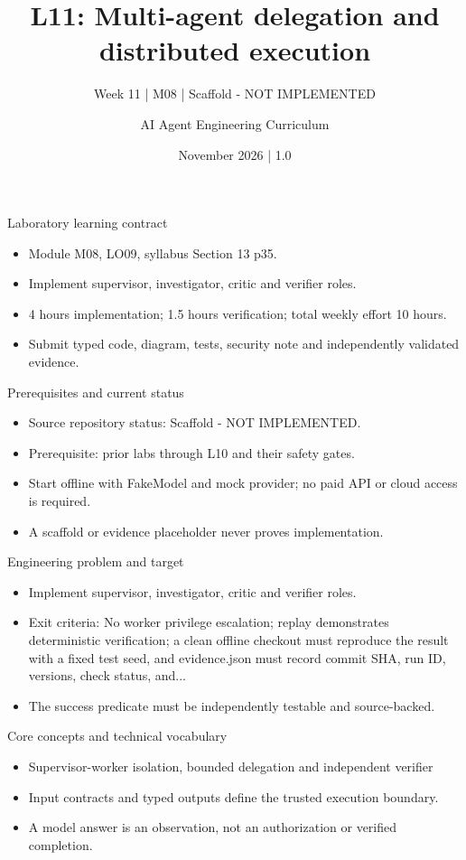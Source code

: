 \documentclass[aspectratio=169,10pt]{beamer}
\title[L11 - Agent Engineering]{L11: Multi-agent delegation and distributed execution}
\subtitle{Week 11 | M08 | Scaffold - NOT IMPLEMENTED}
\author{AI Agent Engineering Curriculum}
\date{November 2026 | 1.0}
\begin{document}
\begin{frame}\titlepage\end{frame}

\begin{frame}{Laboratory learning contract}
\small
\begin{itemize}
\item Module M08, LO09, syllabus Section 13 p35.
\item Implement supervisor, investigator, critic and verifier roles.
\item 4 hours implementation; 1.5 hours verification; total weekly effort 10 hours.
\item Submit typed code, diagram, tests, security note and independently validated evidence.
\end{itemize}

\end{frame}

\begin{frame}{Prerequisites and current status}
\small
\begin{itemize}
\item Source repository status: Scaffold - NOT IMPLEMENTED.
\item Prerequisite: prior labs through L10 and their safety gates.
\item Start offline with FakeModel and mock provider; no paid API or cloud access is required.
\item A scaffold or evidence placeholder never proves implementation.
\end{itemize}

\end{frame}

\begin{frame}{Engineering problem and target}
\small
\begin{itemize}
\item Implement supervisor, investigator, critic and verifier roles.
\item Exit criteria: No worker privilege escalation; replay demonstrates deterministic verification; a clean offline checkout must reproduce the result with a fixed test seed, and evidence.json must record commit SHA, run ID, versions, check status, and...
\item The success predicate must be independently testable and source-backed.
\end{itemize}

\end{frame}

\begin{frame}{Core concepts and technical vocabulary}
\small
\begin{itemize}
\item Supervisor-worker isolation, bounded delegation and independent verifier
\item Input contracts and typed outputs define the trusted execution boundary.
\item A model answer is an observation, not an authorization or verified completion.
\end{itemize}

\end{frame}
\end{document}
